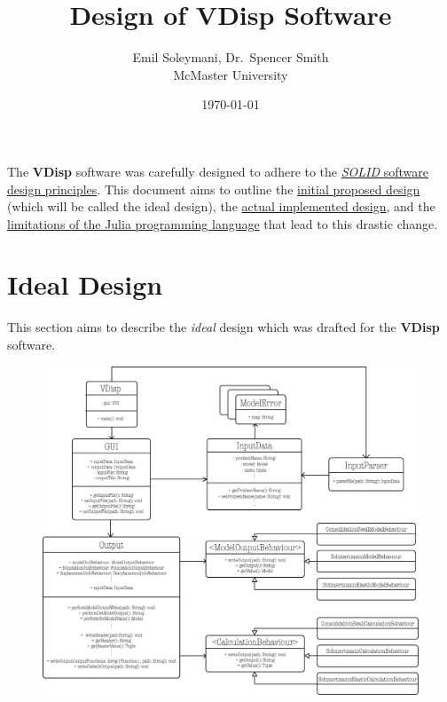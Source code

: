 \documentclass[11pt,fleqn]{article}
\newcommand{\indentpar}{\phantom{=}}
\begin{document}
      
      \title{Design of VDisp Software}
      \date{\today}
      \author{Emil Soleymani, Dr.~Spencer Smith\\ McMaster University}
      \maketitle

      \medskip

      \indentpar The \textbf{VDisp} software was carefully designed to adhere to the \href{https://www.digitalocean.com/community/conceptual_articles/s-o-l-i-d-the-first-five-principles-of-object-oriented-design}{\emph{SOLID} software design principles}.
      This document aims to outline the \hyperref[initialDesign]{initial proposed design} (which will be called the ideal design), the \hyperref[actualDesign]{actual implemented
      design}, and the \hyperref[juliaLimits]{limitations of the Julia programming language} that lead to this drastic change.
      
    
    \pagebreak

    \section*{Ideal Design} \label{initialDesign}

    \indentpar This section aims to describe the \emph{ideal} design which was drafted
    for the \textbf{VDisp} software. \\

    \begin{figure}[h]
        \includegraphics[width=1.3\textwidth]{VDispIdealDesignUML.png}
        \centering
    \end{figure}
\end{document}
